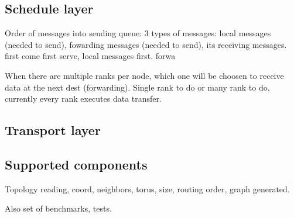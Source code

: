 \subsection{Schedule layer}
Order of messages into sending queue: 3 types of messages: local messages (needed to send), fowarding messages (needed to send), its receiving messages. first come first serve, local messages first. forwa

When there are multiple ranks per node, which one will be choosen to receive data at the next dest (forwarding). Single rank to do or many rank to do, currently every rank executes data transfer.

\subsection{Transport layer}

\subsection{Supported components}

Topology reading, coord, neighbors, torus, size, routing order, graph generated.

Also set of benchmarks, tests.
